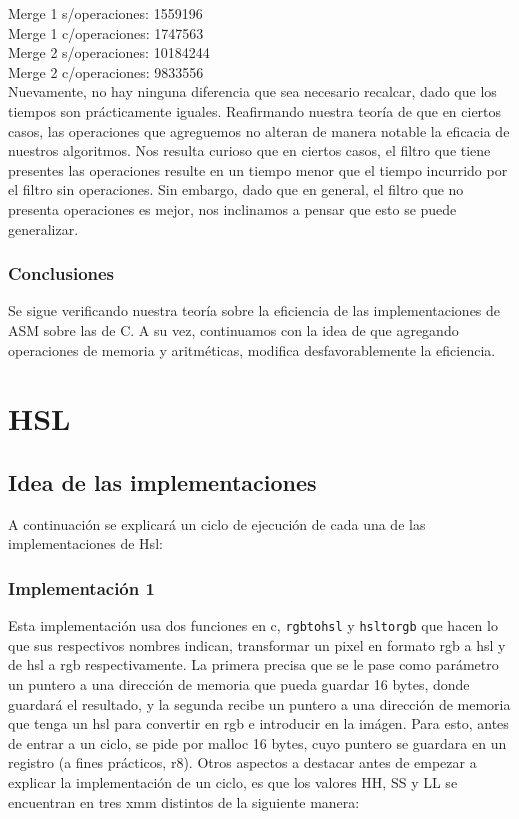 \documentclass[a4paper]{article}
\begin{document}
Merge 1 s/operaciones: 1559196
\\

Merge 1 c/operaciones: 1747563
\\

Merge 2 s/operaciones: 10184244
\\

Merge 2 c/operaciones: 9833556
\\


Nuevamente, no hay ninguna diferencia que sea necesario recalcar, dado que los tiempos son prácticamente iguales. Reafirmando nuestra teoría de que en ciertos casos, las operaciones que agreguemos no alteran de manera notable la eficacia de nuestros algoritmos.
Nos resulta curioso que en ciertos casos, el filtro que tiene presentes las operaciones resulte en un tiempo menor que el tiempo incurrido por el filtro sin operaciones. Sin embargo, dado que en general, el filtro que no presenta operaciones es mejor, nos inclinamos a pensar que esto se puede generalizar.


\subsubsection{Conclusiones}

Se sigue verificando nuestra teoría sobre la eficiencia de las implementaciones de ASM sobre las de C. A su vez, continuamos con la idea de que agregando operaciones de memoria y aritméticas, modifica desfavorablemente la eficiencia.


\newpage

\section{HSL}

\subsection{Idea de las implementaciones}
A continuación se explicará un ciclo de ejecución de cada una de las implementaciones de Hsl:

\subsubsection{Implementación 1}

Esta implementación usa dos funciones en c, {\tt rgbtohsl} y {\tt hsltorgb} que hacen lo que sus respectivos nombres indican, transformar un pixel en formato rgb a hsl y de hsl a rgb respectivamente. La primera precisa que se le pase como parámetro un puntero a una dirección de memoria que pueda guardar 16 bytes, donde guardará el resultado, y la segunda recibe un puntero a una dirección de memoria que tenga un hsl para convertir en rgb e introducir en la imágen. Para esto, antes de entrar a un ciclo, se pide por malloc 16 bytes, cuyo puntero se guardara en un registro (a fines prácticos, r8).
Otros aspectos a destacar antes de empezar a explicar la implementación de un ciclo, es que los valores HH, SS y LL se encuentran en tres xmm distintos de la siguiente manera:
\end{document}
